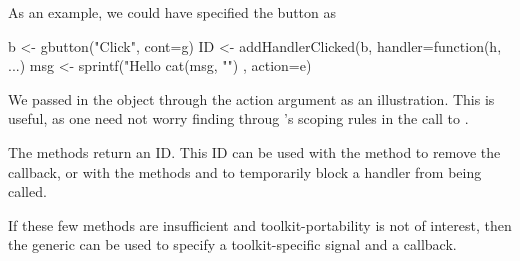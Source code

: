 As an example, we could have specified the button as
\begin{Schunk}
\begin{Sinput}
 b <- gbutton("Click", cont=g)
 ID <- addHandlerClicked(b, handler=function(h, ...) {
   msg <- sprintf("Hello %
   cat(msg, "\n")
 }, action=e)
\end{Sinput}
\end{Schunk}
We passed in the object  through the action argument as an
illustration. This is useful, as one need not worry finding 
throug \R's scoping rules in the
call to .

The  methods return an ID.  This ID can be used
with the method  to remove the callback, or with
the methods  and  to
temporarily block a handler from being called.

If these few methods are insufficient and toolkit-portability is not
of interest, then the  generic can be used to specify
a toolkit-specific signal and a callback.


